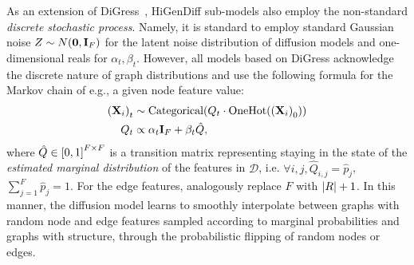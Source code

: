 As an extension of DiGress~\cite{vignac_digress_2022}, HiGenDiff sub-models also employ the non-standard \emph{discrete stochastic process}. Namely, it is standard to employ standard Gaussian noise $Z\sim N\mathopen{}\left(\mathbf{0},\mathbf{I}_F\right)$ for the latent noise distribution of diffusion models and one-dimensional reals for $\alpha_t,\beta_t$. However, all models based on DiGress acknowledge the discrete nature of graph distributions and use the following formula for the Markov chain of e.g., a given node feature value:
\begin{align}
\begin{split}
    \mathopen{}\left(\mathbf{X}_i\right)_t &\sim \text{Categorical}\mathopen{}\left(Q_t \cdot \text{OneHot}\mathopen{}\left(\mathopen{}\left(\mathbf{X}_i\right)_0\right)\right) \\
    Q_t &\propto \alpha_t \mathbf{I}_F + \beta_t \hat{Q},
\end{split}
\end{align}
where $\hat{Q} \in \mathopen{}\left[0,1\right]^{F \times F}$ is a transition matrix representing staying in the state of the \emph{estimated marginal distribution} of the features in $\mathcal{D}$, i.e. $\forall i,j,\hat{Q}_{i,j} = \hat{p}_j$, $\sum_{j=1}^{F}{\hat{p}_j}=1$. For the edge features, analogously replace $F$ with $\mathopen{}\left|R\right|+1$. In this manner, the diffusion model learns to smoothly interpolate between graphs with random node and edge features sampled according to marginal probabilities and graphs with structure, through the probabilistic flipping of random nodes or edges.

